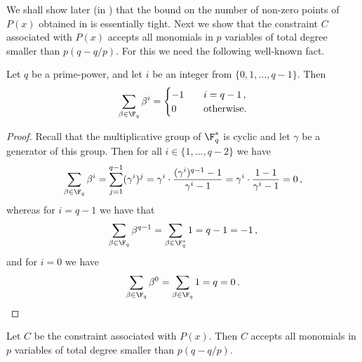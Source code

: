We shall show later (in ) that the bound on the number of non-zero points of $P(x)$ obtained in  is essentially tight.
Next we show that the constraint $C$ associated with  $P(x)$ accepts all monomials in $p$ variables of total degree smaller than $p(q-q/p)$.
For this we need the following well-known fact.

\begin{claim}\label{claim:power-sum}
Let $q$ be a prime-power, and let $i$ be an integer 
%
from
$\{0,1,\ldots,q-1\}$. Then
\[\sum_{\beta \in \F_q} \beta^i = \begin{cases}
  -1 & \quad i = q-1\,, \\
  0 & \quad \text{otherwise.}
\end{cases}
 \]
\end{claim}

\begin{proof}
Recall that the multiplicative group of $\F_q^*$ is cyclic and let $\gamma$ be a generator of this group. Then for all $i \in \{1,\ldots,q-2\}$ we have
$$\sum_{\beta \in \F_q} \beta^i = \sum_{j=1}^{q-1} (\gamma^i)^j = \gamma^i \cdot \frac {(\gamma^i)^{q-1} - 1} {\gamma^i -1} =  \gamma^i \cdot \frac {1- 1} {\gamma^i -1} =0\,, $$
whereas for $i = q-1$ we have that
\[\sum_{\beta \in \F_q} \beta^{q-1} = \sum_{\beta \in \F_q^*} 1 = q-1 = -1\,,\]
and for $i=0$ we have
\[\sum_{\beta \in \F_q} \beta^{0} = \sum_{\beta \in \F_q} 1 = q = 0\,.\qedhere\]
\end{proof}

\begin{lemma}\label{lem:tech-lem-accept}
Let $C$ be the constraint associated with $P(x)$. Then $C$ accepts all monomials in $p$ variables of total degree smaller than $p(q-q/p)$.
\end{lemma}

